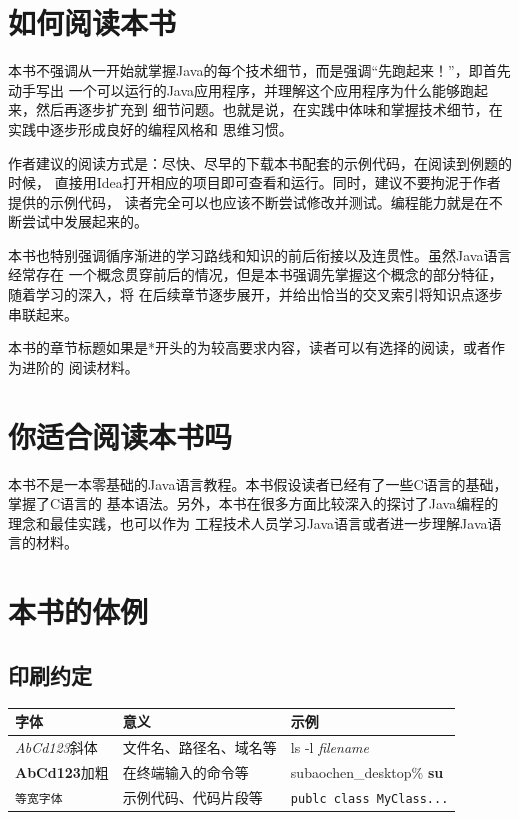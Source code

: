 \section*{如何阅读本书}

本书不强调从一开始就掌握Java的每个技术细节，而是强调“先跑起来！”，即首先动手写出
一个可以运行的Java应用程序，并理解这个应用程序为什么能够跑起来，然后再逐步扩充到
细节问题。也就是说，在实践中体味和掌握技术细节，在实践中逐步形成良好的编程风格和
思维习惯。

作者建议的阅读方式是：尽快、尽早的下载本书配套的示例代码，在阅读到例题的时候，
直接用Idea打开相应的项目即可查看和运行。同时，建议不要拘泥于作者提供的示例代码，
读者完全可以也应该不断尝试修改并测试。编程能力就是在不断尝试中发展起来的。

本书也特别强调循序渐进的学习路线和知识的前后衔接以及连贯性。虽然Java语言经常存在
一个概念贯穿前后的情况，但是本书强调先掌握这个概念的部分特征，随着学习的深入，将
在后续章节逐步展开，并给出恰当的交叉索引将知识点逐步串联起来。

本书的章节标题如果是*开头的为较高要求内容，读者可以有选择的阅读，或者作为进阶的
阅读材料。

\section*{你适合阅读本书吗}
本书不是一本零基础的Java语言教程。本书假设读者已经有了一些C语言的基础，掌握了C语言的
基本语法。另外，本书在很多方面比较深入的探讨了Java编程的理念和最佳实践，也可以作为
工程技术人员学习Java语言或者进一步理解Java语言的材料。

\section*{本书的体例}
\subsection*{印刷约定}
\begin{tabular}{|l|l|l|}
    \hline
    字体 & 意义 & 示例 \\
    \hline
    \textsl{AbCd123}斜体 & 文件名、路径名、域名等 & ls -l \textsl{filename}\\
    \hline
    \textbf{AbCd123}加粗 & 在终端输入的命令等 & subaochen\_desktop\% \textbf{su} \\
    \hline
    \texttt{等宽字体} & 示例代码、代码片段等 & \texttt{publc class MyClass...} \\
    \hline
\end{tabular}

